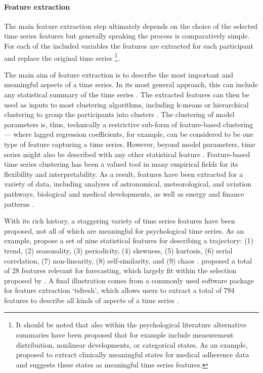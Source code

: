 \documentclass[man, 12pt, a4paper, mask, floatsintext]{apa7}
\theoremstyle{break}
\theoremstyle{plain}
\begin{document}
\paragraph{Feature extraction}
The main feature extraction step ultimately depends on the choice of the selected time series features but generally speaking the process is comparatively simple. For each of the included variables the features are extracted for each participant and replace the original time series \citep{wang2006}\footnote{It should be noted that also within the psychological literature alternative summaries have been proposed that for example include measurement distribution, nonlinear developments, or categorical states. As an example, \citet{kiwuwa-muyingo2011} proposed to extract clinically meaningful states for medical adherence data and suggests these states as meaningful time series features.}.

The main aim of feature extraction is to describe the most important and meaningful aspects of a time series. In its most general approach, this can include any statistical summary of the time series \citep[i.e., feature; e.g.,][]{maharaj2019}. The extracted features can then be used as inputs to most clustering algorithms, including k-means or hierarchical clustering to group the participants into clusters \citep{wang2006}. The clustering of model parameters is, thus, technically a restrictive sub-form of feature-based clustering --- where lagged regression coefficients, for example, can be considered to be one type of feature capturing a time series. However, beyond model parameters, time series might also be described with any other statistical feature \citep{tiano2021}. Feature-based time series clustering has been a valued tool in many empirical fields for its flexibility and interpretability. As a result, features have been extracted for a variety of data, including analyses of astronomical, meteorological, and aviation pathways, biological and medical developments, as well as energy and finance patterns \citep{Aghabozorgi2015}. 

With its rich history, a staggering variety of time series features have been proposed, not all of which are meaningful for psychological time series. As an example, \citet{wang2006} propose a set of nine statistical features for describing a trajectory: (1) trend, (2) seasonality, (3) periodicity, (4) skewness, (5) kurtosis, (6) serial correlation, (7) non-linearity, (8) self-similarity, and (9) chaos \citep[also see][]{fulcher2013}. \citet{adya2001} proposed a total of 28 features relevant for forecasting, which largely fit within the selection proposed by \citet{wang2006}. A final illustration comes from a commonly used software package for feature extraction `tsfresh', which allows users to extract a total of 794 features to describe all kinds of aspects of a time series \citep[][]{christ2018}. 
\end{document}
